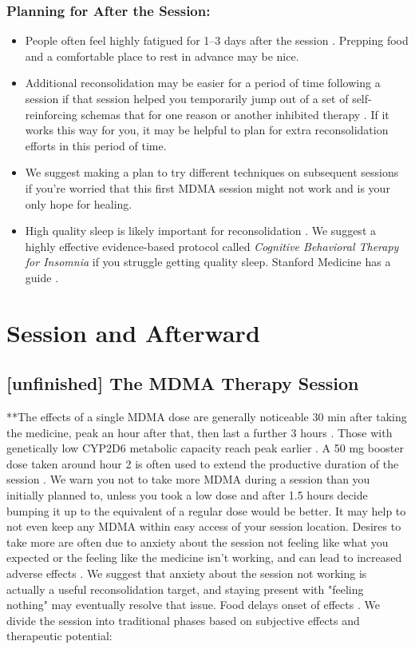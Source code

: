 \documentclass[12pt,letterpaper]{book}
\begin{document}
\subsection*{Planning for After the Session:}
\begin{itemize}
    \item People often feel highly fatigued for 1–3 days after the session \cite{liechtiGender}. Prepping food and a comfortable place to rest in advance may be nice.
    \item Additional reconsolidation may be easier for a period of time following a session if that session helped you temporarily jump out of a set of self-reinforcing schemas that for one reason or another inhibited therapy . If it works this way for you, it may be helpful to plan for extra reconsolidation efforts in this period of time.
    \item We suggest making a plan to try different techniques on subsequent sessions if you're worried that this first MDMA session might not work and is your only hope for healing.
    \item High quality sleep is likely important for reconsolidation \cite{simon2020sleep}. We suggest a highly effective evidence-based protocol called \textit{Cognitive Behavioral Therapy for Insomnia} if you struggle getting quality sleep. Stanford Medicine has a guide \cite{stanfordSleep}.
\end{itemize}
\chapter{Session and Afterward}
\section{[unfinished] The MDMA Therapy Session}
\label{session}
**The effects of a single MDMA dose are generally noticeable 30 min after taking the medicine, peak an hour after that, then last a further 3 hours \cite{vizeliActuteEffects}. Those with genetically low CYP2D6 metabolic capacity reach peak earlier \cite{schmid2016cyp2d6}. A 50 mg booster dose taken around hour 2 is often used to extend the productive duration of the session \cite{liechtiInteractions}. We warn you not to take more MDMA during a session than you initially planned to, unless you took a low dose and after 1.5 hours decide bumping it up to the equivalent of a regular dose would be better. It may help to not even keep any MDMA within easy access of your session location. Desires to take more are often due to anxiety about the session not feeling like what you expected or the feeling like the medicine isn't working, and can lead to increased adverse effects \cite{bruntLinking}. We suggest that anxiety about the session not working is actually a useful reconsolidation target, and staying present with "feeling nothing" may eventually resolve that issue. Food delays onset of effects \cite{MithoeferMDMA}. We divide the session into traditional phases based on subjective effects and therapeutic potential:
\end{document}
